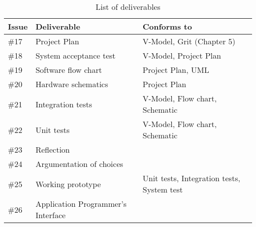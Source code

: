 \begin{table}
\centering
\begin{adjustwidth}{-0.5in}{0.5in}
\centering
\caption{List of deliverables}
\begin{tabular}{lll}
Issue & Deliverable & Conforms to \\
\hline
\#17 & Project Plan & V-Model\cite{vmodel}, Grit (Chapter 5)\cite{grit} \\
\#18 & System acceptance test & V-Model\cite{vmodel}, Project Plan \\
\#19 & Software flow chart & Project Plan, UML\cite{uml} \\
\#20 & Hardware schematics & Project Plan \\
\#21 & Integration tests & V-Model\cite{vmodel}, Flow chart, Schematic \\
\#22 & Unit tests & V-Model\cite{vmodel}, Flow chart, Schematic \\
\#23 & Reflection \\
\#24 & Argumentation of choices \\
\#25 & Working prototype & Unit tests, Integration tests, System test \\
\#26 & Application Programmer's Interface \\
\end{tabular}
\end{adjustwidth}
\label{tab:vmodeldeliverables}
\end{table}

